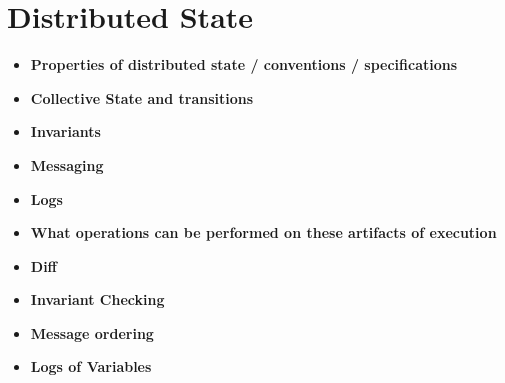 \section{Distributed State}
\label{sec:distributed-state}

\begin{itemize}
    \item \textbf{Properties of distributed state / conventions / specifications}
    \item \textbf{Collective State and transitions}
    \item \textbf{Invariants}
    \item \textbf{Messaging}
    \item \textbf{Logs}
    \item \textbf{What operations can be performed on these artifacts of execution}
    \item \textbf{Diff}
    \item \textbf{Invariant Checking}
    \item \textbf{Message ordering}
    \item \textbf{Logs of Variables}
\end{itemize}
